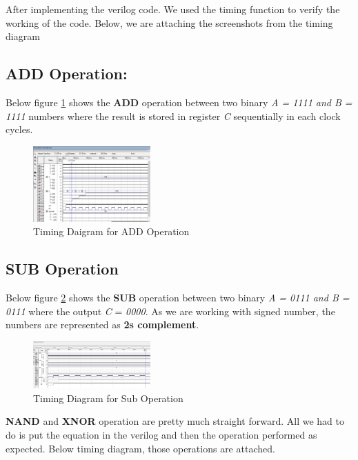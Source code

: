 After implementing the verilog code.
We used the timing function to verify the working of the code.
Below, we are attaching the screenshots from the timing diagram

\subsection{ADD Operation:}\label{subsec:add-operation}
Below figure \ref{fig:timing add} shows the \textbf{ADD} operation between two binary \textit{A = 1111 and B = 1111} numbers
where the result is stored in register \textit{C} sequentially in each clock cycles.
\begin{figure}[H]
    \begin{center}
        \includegraphics[width = 0.4\textwidth]{figures/add}
    \end{center}
    \caption{Timing Daigram for ADD Operation}
    \label{fig:timing add}
\end{figure}

\subsection{SUB Operation}\label{subsec:sub-operation}
Below figure \ref{fig:timing sub} shows the \textbf{SUB} operation between two binary \textit{A = 0111 and B = 0111} where the output \textit{C} = \textit{0000}.
As we are working with signed number, the numbers are represented as \textbf{2s complement}.

\begin{figure}[H]
    \begin{center}
        \includegraphics[width = 0.4\textwidth]{figures/Sub_Operation}
    \end{center}
    \caption{Timing Diagram for Sub Operation}
    \label{fig:timing sub}
\end{figure}

\textbf{NAND} and \textbf{XNOR} operation are pretty much straight forward.
All we had to do is put the equation in the verilog and then the
operation performed as expected.
Below timing diagram, those operations are attached.

